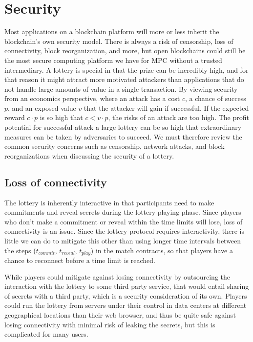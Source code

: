 \section{Security}
\label{sec:security}

Most applications on a blockchain platform will more or less inherit the blockchain's own security model. There is always a risk of censorship, loss of connectivity, block reorganization, and more, but open blockchains could still be the most secure computing platform we have for MPC without a trusted intermediary. A lottery is special in that the prize can be incredibly high, and for that reason it might attract more motivated attackers than applications that do not handle large amounts of value in a single transaction. By viewing security from an economics perspective, where an attack has a cost $c$, a chance of success $p$, and an exposed value $v$ that the attacker will gain if successful. If the expected reward $c \cdot p$ is so high that $c < v \cdot p$, the risks of an attack are too high. The profit potential for successful attack a large lottery can be so high that extraordinary measures can be taken by adversaries to succeed. We must therefore review the common security concerns such as censorship, network attacks, and block reorganizations when discussing the security of a lottery. 

\subsection{Loss of connectivity}
The lottery is inherently interactive in that participants need to make commitments and reveal secrets during the lottery playing phase. Since players who don't make a commitment or reveal within the time limits will lose, loss of connectivity is an issue. Since the lottery protocol requires interactivity, there is little we can do to mitigate this other than using longer time intervals between the steps ($t_{commit}$, $t_{reveal}$, $t_{play}$) in the match contracts, so that players have a chance to reconnect before a time limit is reached.

While players could mitigate against losing connectivity by outsourcing the interaction with the lottery to some third party service, that would entail sharing of secrets with a third party, which is a security consideration of its own. Players could run the lottery from servers under their control in data centers at different geographical locations than their web browser, and thus be quite safe against losing connectivity with minimal risk of leaking the secrets, but this is complicated for many users. 

